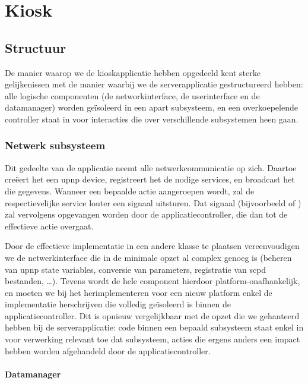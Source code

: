 \part{Kiosk}
\label{kiosk}

\chapter{Structuur}
\label{kiosk:structuur}

De manier waarop we de kioskapplicatie hebben opgedeeld kent sterke gelijkenissen met de manier waarbij we de serverapplicatie gestructureerd hebben: alle logische componenten (de networkinterface, de userinterface en de datamanager) worden geïsoleerd in een apart subsysteem, en een overkoepelende controller staat in voor interacties die over verschillende subsystemen heen gaan.

\section{Netwerk subsysteem}
\label{kiosk:structuur:netwerk}

Dit gedeelte van de applicatie neemt alle netwerkcommunicatie op zich. Daartoe creëert het een \ac{upnp} device, registreert het de nodige services, en broadcast het die gegevens. Wanneer een bepaalde actie aangeroepen wordt, zal de respectievelijke service louter een signaal uitsturen. Dat signaal (bijvoorbeeld  of ) zal vervolgens opgevangen worden door de applicatiecontroller, die dan tot de effectieve actie overgaat.

Door de effectieve implementatie in een andere klasse te plaatsen vereenvoudigen we de netwerkinterface die in de minimale opzet al complex genoeg is (beheren van \ac{upnp} state variables, conversie van parameters, registratie van \ac{scpd} bestanden, \ldots). Tevens wordt de hele component hierdoor platform-onafhankelijk, en moeten we bij het herimplementeren voor een nieuw platform enkel de implementatie herschrijven die volledig geïsoleerd is binnen de applicatiecontroller. Dit is opnieuw vergelijkbaar met de opzet die we gehanteerd hebben bij de serverapplicatie: code binnen een bepaald subsysteem staat enkel in voor verwerking relevant toe dat subsysteem, acties die ergens anders een impact hebben worden afgehandeld door de applicatiecontroller.

\subsection{Datamanager}
\label{kiosk:structuur:datamanager}

